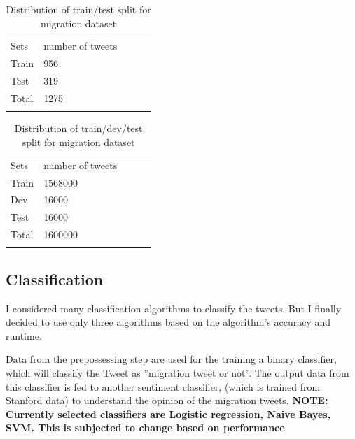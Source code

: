 \begin{table}[]
\centering
\begin{tabular}{lllll}
\cline{1-2}
\multicolumn{1}{|l|}{Sets}   & \multicolumn{1}{l|}{number of tweets} &  &  &  \\ \cline{1-2}
\multicolumn{1}{|l|}{Train} & \multicolumn{1}{l|}{956}  &  &  &  \\ \cline{1-2}
\multicolumn{1}{|l|}{Test} & \multicolumn{1}{l|}{319}  &  &  &  \\ \cline{1-2}
\multicolumn{1}{|l|}{Total}   & \multicolumn{1}{l|}{1275}  &  &  &  \\ \cline{1-2}
                            &                           &  &  & 
\label{tab:Distribution of sentiment class}
\end{tabular}
\caption{Distribution of train/test split for migration dataset}
\label{tab:Distmigrationdataset}
\end{table}

\begin{table}[]
\centering
\begin{tabular}{lllll}
\cline{1-2}
\multicolumn{1}{|l|}{Sets}   & \multicolumn{1}{l|}{number of tweets} &  &  &  \\ \cline{1-2}
\multicolumn{1}{|l|}{Train} & \multicolumn{1}{l|}{1568000}  &  &  &  \\ \cline{1-2}
\multicolumn{1}{|l|}{Dev} & \multicolumn{1}{l|}{16000 }  &  &  &  \\ \cline{1-2}
\multicolumn{1}{|l|}{Test} & \multicolumn{1}{l|}{16000 }  &  &  &  \\ \cline{1-2}
\multicolumn{1}{|l|}{Total}   & \multicolumn{1}{l|}{1600000}  &  &  &  \\ \cline{1-2}
                            &                           &  &  & 
\label{tab:Distribution of sentiment class}
\end{tabular}
\caption{Distribution of train/dev/test split for migration dataset}
\label{tab:Distsentimentdatset}
\end{table}


\subsection{Classification}
I considered many classification algorithms to classify the tweets. But I finally decided to use only three algorithms based on the algorithm's accuracy and runtime.

 




Data from the prepossessing step are used for the training a binary classifier,
which will classify the Tweet as ”migration tweet or not”. The output data
from this classifier is fed to another sentiment classifier, (which is trained from
Stanford data) to understand the opinion of the migration tweets.
\textbf{NOTE: Currently selected classifiers are Logistic regression, Naive Bayes, SVM. This is subjected to change based on performance}
